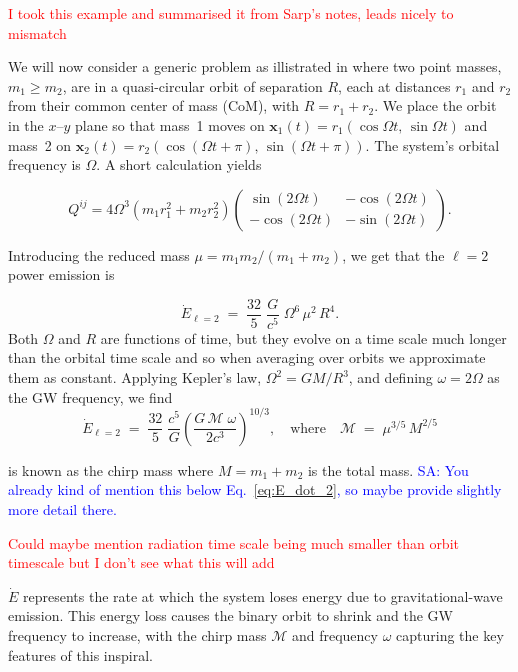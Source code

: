 \documentclass{article}
\newcommand{\Sarp}[1]{{\textcolor{blue}{{SA: #1}} }}
\begin{document}
\textcolor{red}{I took this example and summarised it from Sarp's notes, leads nicely to mismatch}

\noindent
We will now consider a generic problem as illistrated in \cite{intoGRSarp} where two point masses, \(m_1 \ge m_2\), are in a quasi-circular orbit of separation \(R\),
each at distances \(r_1\) and \(r_2\) from their common center of mass (CoM), with
\(R = r_1 + r_2\). We place the orbit in the \(x\)--\(y\) plane so that mass~1 moves on
\(\mathbf{x}_1(t) = r_1(\cos\Omega t,\,\sin\Omega t)\) and mass~2 on
\(\mathbf{x}_2(t) = r_2(\cos(\Omega t+\pi),\,\sin(\Omega t+\pi))\). The system’s orbital
frequency is \(\Omega\). A short calculation yields

\begin{equation}
    Q^{ij} = 4 \Omega^3 \left(m_1 r_1^2 + m_2 r_2^2\right)
    \begin{pmatrix}
    \sin(2\Omega t) & -\cos(2\Omega t) \\
    -\cos(2\Omega t) & -\sin(2\Omega t)
    \end{pmatrix}.
\end{equation}

\noindent
Introducing the reduced mass \(\mu = m_1 m_2/(m_1 + m_2)\), we get that the \(\ell=2\) power emission is

\begin{equation}\label{eq:E_dot_2}
\dot{E}_{\ell=2}
\;=\;
\frac{32}{5}\;\frac{G}{c^5}\;\Omega^6\,\mu^2\,R^4.
\end{equation}
Both \(\Omega\) and \(R\) are functions of time, but they evolve on a time scale much longer than the orbital time
scale and so when averaging over orbits we approximate them as constant. Applying Kepler’s law, \(\Omega^2 = GM/R^3\), and defining
\(\omega = 2\Omega\) as the GW frequency, we find
\begin{equation}
\dot{E}_{\ell=2}
\;=\;
\frac{32}{5}\;\frac{c^5}{G}
\left(\frac{G\,\mathcal{M}\;\omega}{2c^3}\right)^{10/3},
\quad
\text{where}
\quad
\mathcal{M} \;=\;\mu^{3/5}\,M^{2/5}
\end{equation}

\noindent
is known as the chirp mass where $M = m_1+m_2$ is the total mass.
\Sarp{You already kind of mention this below Eq.~\eqref{eq:E_dot_2}, so maybe provide slightly
more detail there.}

\noindent
\textcolor{red}{Could maybe mention radiation time scale being much smaller than orbit timescale but I don't see what this will add}

\noindent
$ \dot{E} $ represents the rate at which the system loses energy due to gravitational-wave emission.
This energy loss causes the binary orbit to shrink and the GW frequency to increase, 
with the chirp mass \(\mathcal{M}\) and frequency \(\omega\) capturing the key features of this inspiral.
\end{document}
